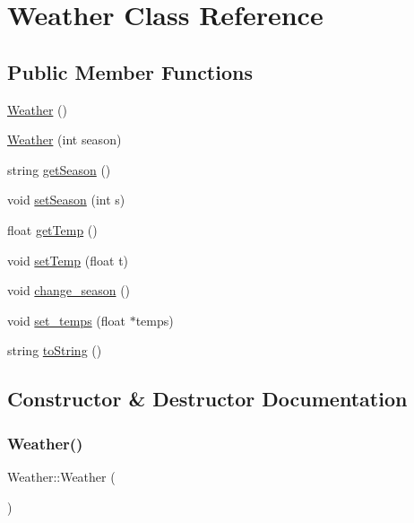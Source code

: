 \hypertarget{class_weather}{}\section{Weather Class Reference}
\label{class_weather}
\subsection*{Public Member Functions}
\begin{DoxyCompactItemize}
\item 
\hyperlink{class_weather_aa404c94fec05b825454a7309827767c6}{Weather} ()
\item 
\hyperlink{class_weather_a3e640271357cec740bb5c21577a7690b}{Weather} (int season)
\item 
string \hyperlink{class_weather_aa82920f50a7ee77af1ae8af0ce913d0c}{get\+Season} ()
\item 
void \hyperlink{class_weather_af5d55c02bf46aef483a52454ad13d9d7}{set\+Season} (int s)
\item 
float \hyperlink{class_weather_a35568e635e7b92edf85937fdab293d9d}{get\+Temp} ()
\item 
void \hyperlink{class_weather_a18a24d73cc6fa3bf83c5e5033109b321}{set\+Temp} (float t)
\item 
void \hyperlink{class_weather_a8104189f3e6a3759c1b02750c8a977c5}{change\+\_\+season} ()
\item 
void \hyperlink{class_weather_acd62160ebada5a9f7658f45042e44372}{set\+\_\+temps} (float $\ast$temps)
\item 
string \hyperlink{class_weather_a6d4f87a1b1f5e07099b1d315385f3f5b}{to\+String} ()
\end{DoxyCompactItemize}


\subsection{Constructor \& Destructor Documentation}
\mbox{\label{class_weather_aa404c94fec05b825454a7309827767c6}} 
\subsubsection{\texorpdfstring{Weather()}{Weather()}\hspace{0.1cm}{\footnotesize\ttfamily [1/2]}}
{\footnotesize\ttfamily Weather\+::\+Weather (\begin{DoxyParamCaption}{ }\end{DoxyParamCaption})}

